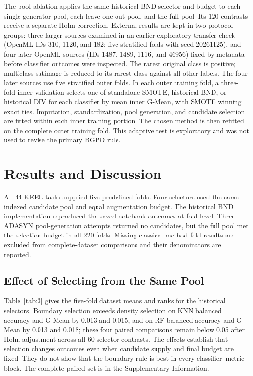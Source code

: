 \documentclass[pdflatex]{sn-jnl}
\begin{document}
The pool ablation applies the same historical BND selector and budget to each single-generator pool, each leave-one-out pool, and the full pool. Its 120 contrasts receive a separate Holm correction. External results are kept in two protocol groups: three larger sources examined in an earlier exploratory transfer check (OpenML IDs 310, 1120, and 182; five stratified folds with seed 20261125), and four later OpenML sources (IDs 1487, 1489, 1116, and 46956) fixed by metadata before classifier outcomes were inspected. The rarest original class is positive; multiclass satimage is reduced to its rarest class against all other labels. The four later sources use five stratified outer folds. In each outer training fold, a three-fold inner validation selects one of standalone SMOTE, historical BND, or historical DIV for each classifier by mean inner G-Mean, with SMOTE winning exact ties. Imputation, standardization, pool generation, and candidate selection are fitted within each inner training portion. The chosen method is then refitted on the complete outer training fold. This adaptive test is exploratory and was not used to revise the primary BGPO rule.

\section{Results and Discussion}\label{sec:5}

All 44 KEEL tasks supplied five predefined folds. Four selectors used the same indexed candidate pool and equal augmentation budget. The historical BND implementation reproduced the saved notebook outcomes at fold level. Three ADASYN pool-generation attempts returned no candidates, but the full pool met the selection budget in all 220 folds. Missing classical-method fold results are excluded from complete-dataset comparisons and their denominators are reported.

\subsection{Effect of Selecting from the Same Pool}

Table~\ref{tab:3} gives the five-fold dataset means and ranks for the historical selectors. Boundary selection exceeds density selection on KNN balanced accuracy and G-Mean by 0.013 and 0.015, and on RF balanced accuracy and G-Mean by 0.013 and 0.018; these four paired comparisons remain below 0.05 after Holm adjustment across all 60 selector contrasts. The effects establish that selection changes outcomes even when candidate supply and final budget are fixed. They do not show that the boundary rule is best in every classifier--metric block. The complete paired set is in the Supplementary Information.
\end{document}
